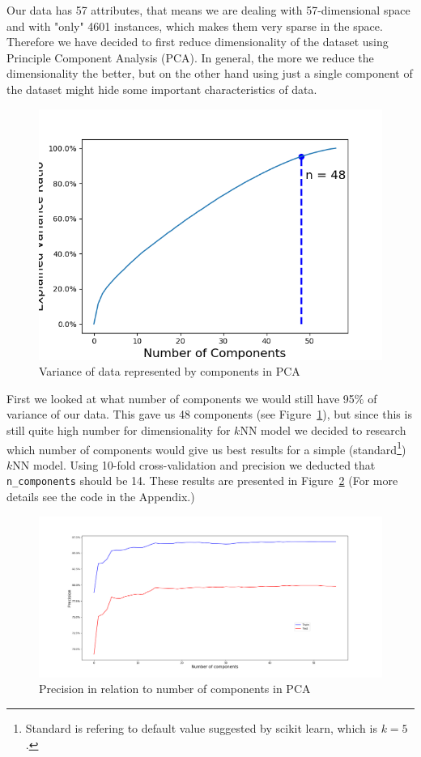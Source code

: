 \documentclass[11pt,a4paper]{article}
\begin{document}
Our data has 57 attributes, that means we are dealing with 57-dimensional space and with "only" 4601 instances, which makes them very sparse in the space. Therefore we have decided to first reduce dimensionality of the dataset using Principle Component Analysis (PCA). In general, the more we reduce the dimensionality the better, but on the other hand using just a single component of the dataset might hide some important characteristics of data. 
\begin{figure}[ht!]
\centering
\includegraphics[scale=0.60]{n_components.png}
\caption{Variance of data represented by components in PCA}
\label{fig:n-components}
\end{figure}
First we looked at what number of components we would still have 95$\%$ of variance of our data. This gave us 48 components (see Figure~\ref{fig:n-components}), but since this is still quite high number for dimensionality for $k$NN model we decided to research which number of components would give us best results for a simple (standard\footnote{Standard is refering to default value suggested by scikit learn, which is $k=5$.}) $k$NN model. Using 10-fold cross-validation and precision we deducted that {\tt n\_components} should be 14. These results are presented in Figure~\ref{fig:hypertune_n_components} (For more details see the code in the Appendix.)
\begin{figure}[ht!]
\centering
\hspace*{-17mm}
\includegraphics[scale=0.40]{hypertune_n_components_recall.png}
\caption{Precision in relation to number of components in PCA}
\label{fig:hypertune_n_components}
\end{figure}
\end{document}
